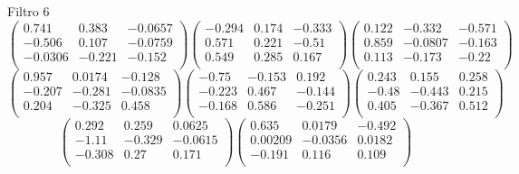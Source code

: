 Filtro 6
{ \small
\[
\begin{pmatrix}
  0.741 & 0.383 & -0.0657 \\
  -0.506 & 0.107 & -0.0759 \\
  -0.0306 & -0.221 & -0.152 \\
\end{pmatrix}
\begin{pmatrix}
  -0.294 & 0.174 & -0.333 \\
  0.571 & 0.221 & -0.51 \\
  0.549 & 0.285 & 0.167 \\
\end{pmatrix}
\begin{pmatrix}
  0.122 & -0.332 & -0.571 \\
  0.859 & -0.0807 & -0.163 \\
  0.113 & -0.173 & -0.22 \\
\end{pmatrix}
\]
\[
\begin{pmatrix}
  0.957 & 0.0174 & -0.128 \\
  -0.207 & -0.281 & -0.0835 \\
  0.204 & -0.325 & 0.458 \\
\end{pmatrix}
\begin{pmatrix}
  -0.75 & -0.153 & 0.192 \\
  -0.223 & 0.467 & -0.144 \\
  -0.168 & 0.586 & -0.251 \\
\end{pmatrix}
\begin{pmatrix}
  0.243 & 0.155 & 0.258 \\
  -0.48 & -0.443 & 0.215 \\
  0.405 & -0.367 & 0.512 \\
\end{pmatrix}
\]
\[
\begin{pmatrix}
  0.292 & 0.259 & 0.0625 \\
  -1.11 & -0.329 & -0.0615 \\
  -0.308 & 0.27 & 0.171 \\
\end{pmatrix}
\begin{pmatrix}
  0.635 & 0.0179 & -0.492 \\
  0.00209 & -0.0356 & 0.0182 \\
  -0.191 & 0.116 & 0.109 \\
\end{pmatrix}
\]
}

